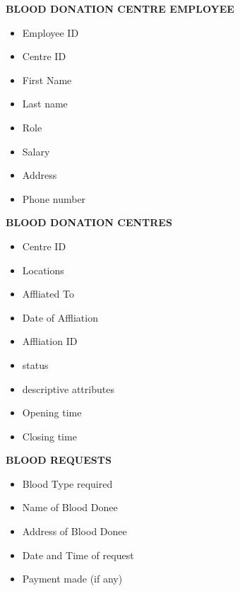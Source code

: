\textbf{BLOOD DONATION CENTRE EMPLOYEE}
\begin{itemize}
  \item Employee ID
  \item Centre ID
  \item First Name
  \item Last name
  \item Role
  \item Salary
  \item Address
  \item Phone number
\end{itemize}

\textbf{BLOOD DONATION CENTRES}
\begin{itemize}
  \item Centre ID
  \item Locations
  \item Affliated To
  \item Date of Affliation
  \item Affliation ID
   \item status
 \item descriptive attributes
 \item Opening time
 \item Closing time
\end{itemize}

\textbf{BLOOD REQUESTS}
\begin{itemize}
  \item Blood Type required
  \item Name of Blood Donee
  \item Address of Blood Donee
  \item Date and Time of request
  \item Payment made (if any)
\end{itemize}
